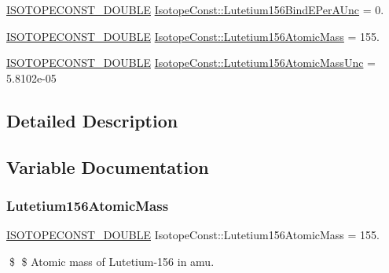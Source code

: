 \begin{DoxyCompactItemize}
\mbox{\hyperlink{group___isotope_const-_macros_ga8f45a7272ce02c0b4c65c44636ed719a}{I\+S\+O\+T\+O\+P\+E\+C\+O\+N\+S\+T\+\_\+\+D\+O\+U\+B\+LE}} \mbox{\hyperlink{group___isotope_const-_lutetium-_lu156_ga1b31398108af89adf5ecbe8f195ed1ec}{Isotope\+Const\+::\+Lutetium156\+Bind\+E\+Per\+A\+Unc}} = 0.
\item 
\mbox{\hyperlink{group___isotope_const-_macros_ga8f45a7272ce02c0b4c65c44636ed719a}{I\+S\+O\+T\+O\+P\+E\+C\+O\+N\+S\+T\+\_\+\+D\+O\+U\+B\+LE}} \mbox{\hyperlink{group___isotope_const-_lutetium-_lu156_ga34d6c9e084f4b43c7c53899ffc96f839}{Isotope\+Const\+::\+Lutetium156\+Atomic\+Mass}} = 155.
\item 
\mbox{\hyperlink{group___isotope_const-_macros_ga8f45a7272ce02c0b4c65c44636ed719a}{I\+S\+O\+T\+O\+P\+E\+C\+O\+N\+S\+T\+\_\+\+D\+O\+U\+B\+LE}} \mbox{\hyperlink{group___isotope_const-_lutetium-_lu156_ga63c08afa8cc4f2660699ac4f0939158c}{Isotope\+Const\+::\+Lutetium156\+Atomic\+Mass\+Unc}} = 5.\+8102e-\/05
\end{DoxyCompactItemize}


\subsection{Detailed Description}


\subsection{Variable Documentation}
\mbox{\label{group___isotope_const-_lutetium-_lu156_ga34d6c9e084f4b43c7c53899ffc96f839}} 
\subsubsection{\texorpdfstring{Lutetium156\+Atomic\+Mass}{Lutetium156AtomicMass}}
{\footnotesize\ttfamily \mbox{\hyperlink{group___isotope_const-_macros_ga8f45a7272ce02c0b4c65c44636ed719a}{I\+S\+O\+T\+O\+P\+E\+C\+O\+N\+S\+T\+\_\+\+D\+O\+U\+B\+LE}} Isotope\+Const\+::\+Lutetium156\+Atomic\+Mass = 155.}

\$ \$ Atomic mass of Lutetium-\/156 in amu. \mbox{\label{group___isotope_const-_lutetium-_lu156_ga63c08afa8cc4f2660699ac4f0939158c}} 
